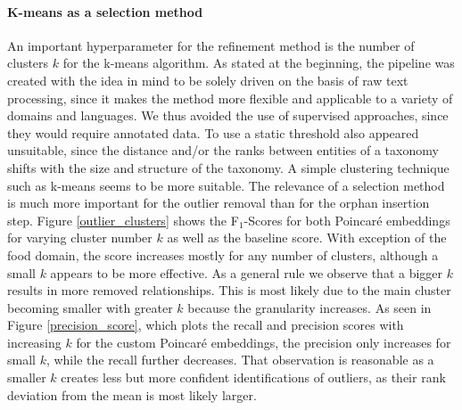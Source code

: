 \documentclass[12pt, headsepline, a4paper]{scrartcl}
\begin{document}
\paragraph{K-means as a selection method}
An important hyperparameter for the refinement method is the number of clusters $k$ for the k-means algorithm. As stated at the beginning, the pipeline was created with the idea in mind to be solely driven on the basis of raw text processing, since it makes the method more flexible and applicable to a variety of domains and languages. We thus avoided the use of supervised approaches, since they would require annotated data.
To use a static threshold also appeared unsuitable, since the distance and/or the ranks between entities of a taxonomy shifts with the size and structure of the taxonomy. A simple clustering technique such as k-means seems to be more suitable. The relevance of a selection method is much more important for the outlier removal than for the orphan insertion step. Figure \ref{outlier_clusters} shows the F$_1$-Scores for both Poincaré embeddings for varying cluster number $k$ as well as the baseline score. With exception of the food domain, the score increases mostly for any number of clusters, although a small $k$ appears to be more effective. As a general rule we observe that a bigger $k$ results in more removed relationships. This is most likely due to the main cluster becoming smaller with greater $k$ because the granularity increases. As seen in Figure \ref{precision_score}, which plots the recall and precision scores with increasing $k$ for the custom Poincaré embeddings, the precision only increases for small $k$, while the recall further decreases. That observation is reasonable as a smaller $k$ creates less but more confident identifications of outliers, as their rank deviation from the mean is most likely larger.
\end{document}
